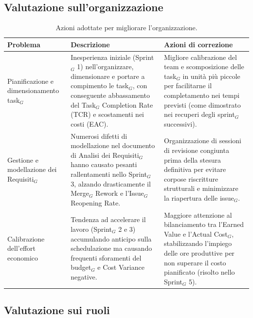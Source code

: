 \documentclass[a4paper, 10pt, colorlinks=true, linkcolor=black, urlcolor=blue, citecolor=blue, hidelinks]{article}
\begin{document}
\subsection{Valutazione sull'organizzazione}

\begin{table}[H]
    \centering
    \renewcommand{\arraystretch}{1.5}
    \begin{tabularx}{\textwidth}{|>{\raggedright\arraybackslash}p{3.5cm}|>{\raggedright\arraybackslash}X|>{\raggedright\arraybackslash}X|}
        \hline
        \textbf{Problema} & \textbf{Descrizione} & \textbf{Azioni di correzione} \\ \hline
        
        Pianificazione e dimensionamento task$_G$ & Inesperienza iniziale (Sprint$_G$ 1) nell'organizzare, dimensionare e portare a compimento le task$_G$, con conseguente abbassamento del Task$_G$ Completion Rate (TCR) e scostamenti nei costi (EAC). & Migliore calibrazione del team e scomposizione delle task$_G$ in unità più piccole per facilitarne il completamento nei tempi previsti (come dimostrato nei recuperi degli sprint$_G$ successivi). \\ \hline
        
        Gestione e modellazione dei Requisiti$_G$ & Numerosi difetti di modellazione nel documento di Analisi dei Requisiti$_G$ hanno causato pesanti rallentamenti nello Sprint$_G$ 3, alzando drasticamente il Merge$_G$ Rework e l'Issue$_G$ Reopening Rate. & Organizzazione di sessioni di revisione congiunta prima della stesura definitiva per evitare corpose riscritture strutturali e minimizzare la riapertura delle issue$_G$. \\ \hline
        
        Calibrazione dell'effort economico & Tendenza ad accelerare il lavoro (Sprint$_G$ 2 e 3) accumulando anticipo sulla schedulazione ma causando frequenti sforamenti del budget$_G$ e Cost Variance negative. & Maggiore attenzione al bilanciamento tra l'Earned Value e l'Actual Cost$_G$, stabilizzando l'impiego delle ore produttive per non superare il costo pianificato (risolto nello Sprint$_G$ 5). \\ \hline
    \end{tabularx}
    \caption{Azioni adottate per migliorare l'organizzazione.}
    \label{tab:azioni-org}
\end{table}

\subsection{Valutazione sui ruoli}
\end{document}
